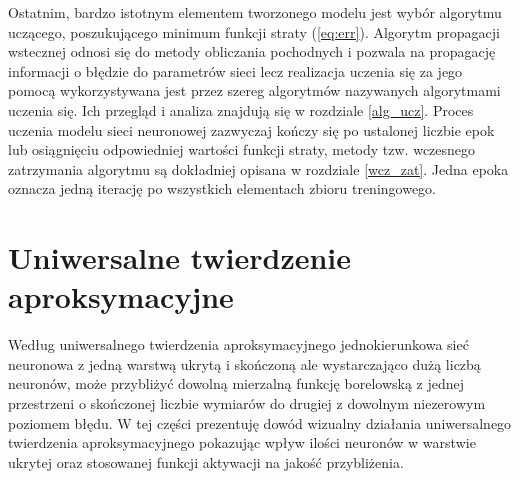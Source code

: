 \documentclass[11pt]{book}
\theoremstyle{definition}
\begin{document}
Ostatnim, bardzo istotnym elementem tworzonego modelu jest wybór algorytmu uczącego, poszukującego minimum funkcji straty (\ref{eq:err}). Algorytm propagacji wstecznej odnosi się do metody obliczania pochodnych i pozwala na propagację informacji o błędzie do parametrów sieci lecz realizacja uczenia się za jego pomocą wykorzystywana jest przez szereg algorytmów nazywanych algorytmami uczenia się. Ich przegląd i analiza znajdują się w rozdziale \ref{alg_ucz}. Proces uczenia modelu sieci neuronowej zazwyczaj kończy się po ustalonej liczbie epok lub osiągnięciu odpowiedniej wartości funkcji straty, metody tzw. wczesnego zatrzymania algorytmu są dokładniej opisana w rozdziale \ref{wcz_zat}. Jedna epoka oznacza jedną iterację po wszystkich elementach zbioru treningowego.


\section{Uniwersalne twierdzenie aproksymacyjne}
\label{uniapprox}

Według uniwersalnego twierdzenia aproksymacyjnego jednokierunkowa sieć neuronowa z jedną warstwą ukrytą i skończoną ale wystarczająco dużą liczbą neuronów, może przybliżyć dowolną mierzalną funkcję borelowską z jednej przestrzeni o skończonej liczbie wymiarów do drugiej z dowolnym niezerowym poziomem błędu. W tej części prezentuję dowód wizualny działania uniwersalnego twierdzenia aproksymacyjnego pokazując wpływ ilości neuronów w warstwie ukrytej oraz stosowanej funkcji aktywacji na jakość przybliżenia.
\end{document}
